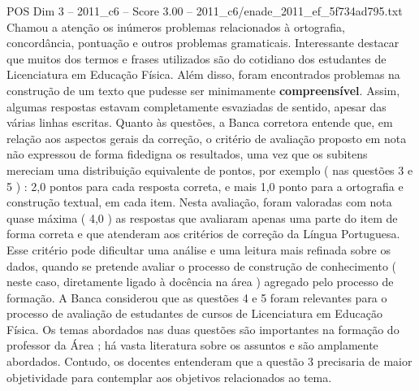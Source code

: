 \begin{textsample}{POS Dim 3 – 2011\_c6 – Score 3.00 – 2011\_c6/enade\_2011\_ef\_5f734ad795.txt}
Chamou a atenção os inúmeros problemas relacionados à ortografia, concordância, pontuação e outros problemas gramaticais.
Interessante destacar que muitos dos termos e frases utilizados são do cotidiano dos estudantes de Licenciatura em Educação Física.
Além disso, foram encontrados problemas na construção de um texto que pudesse ser minimamente \textbf{compreensível}.
Assim, algumas respostas estavam completamente esvaziadas de sentido, apesar das várias linhas escritas.
Quanto às questões, a Banca corretora entende que, em relação aos aspectos gerais da correção, o critério de avaliação proposto em nota não expressou de forma fidedigna os resultados, uma vez que os subitens mereciam uma distribuição equivalente de pontos, por exemplo ( nas questões 3 e 5 ) : 2,0 pontos para cada resposta correta, e mais 1,0 ponto para a ortografia e construção textual, em cada item.
Nesta avaliação, foram valoradas com nota quase máxima ( 4,0 ) as respostas que avaliaram apenas uma parte do item de forma correta e que atenderam aos critérios de correção da Língua Portuguesa.
Esse critério pode dificultar uma análise e uma leitura mais refinada sobre os dados, quando se pretende avaliar o processo de construção de conhecimento ( neste caso, diretamente ligado à docência na área ) agregado pelo processo de formação.
A Banca considerou que as questões 4 e 5 foram relevantes para o processo de avaliação de estudantes de cursos de Licenciatura em Educação Física.
Os temas abordados nas duas questões são importantes na formação do professor da Área ; há vasta literatura sobre os assuntos e são amplamente abordados.
Contudo, os docentes entenderam que a questão 3 precisaria de maior objetividade para contemplar aos objetivos relacionados ao tema.

\end{textsample}

